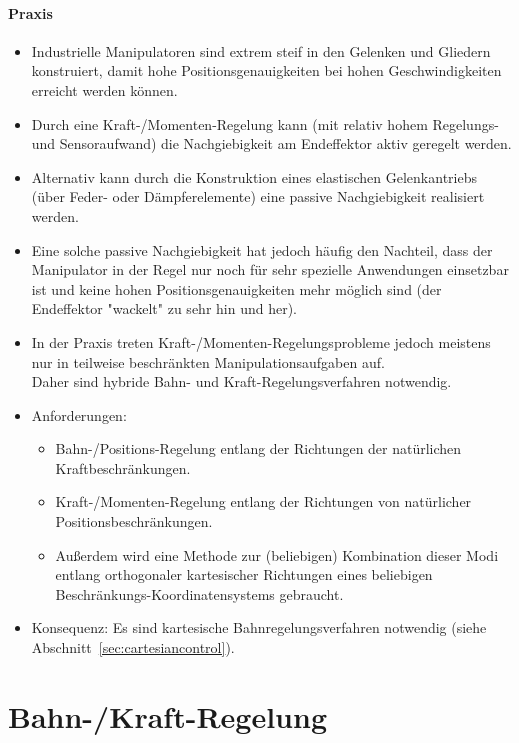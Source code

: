 		\paragraph{Praxis}
			\begin{itemize}
				\item Industrielle Manipulatoren sind extrem steif in den Gelenken und Gliedern konstruiert, damit hohe Positionsgenauigkeiten bei hohen Geschwindigkeiten erreicht werden können.
				\item Durch eine Kraft-/Momenten-Regelung kann (mit relativ hohem Regelungs- und Sensoraufwand) die Nachgiebigkeit am Endeffektor aktiv geregelt werden.
				\item Alternativ kann durch die Konstruktion eines elastischen Gelenkantriebs (\zB über Feder- oder Dämpferelemente) eine passive Nachgiebigkeit realisiert werden.
				\item Eine solche passive Nachgiebigkeit hat jedoch häufig den Nachteil, dass der Manipulator in der Regel nur noch für sehr spezielle Anwendungen einsetzbar ist und keine hohen Positionsgenauigkeiten mehr möglich sind (der Endeffektor "wackelt" zu sehr hin und her).
				\item In der Praxis treten Kraft-/Momenten-Regelungsprobleme jedoch meistens nur in teilweise beschränkten Manipulationsaufgaben auf. \\ Daher sind hybride Bahn- und Kraft-Regelungsverfahren notwendig.
				\item Anforderungen:
					\begin{itemize}
						\item Bahn-/Positions-Regelung entlang der Richtungen der natürlichen Kraftbeschränkungen.
						\item Kraft-/Momenten-Regelung entlang der Richtungen von natürlicher Positionsbeschränkungen.
						\item Außerdem wird eine Methode zur (beliebigen) Kombination dieser Modi entlang orthogonaler kartesischer Richtungen eines beliebigen Beschränkungs-Koordinatensystems gebraucht.
					\end{itemize}
				\item Konsequenz: Es sind kartesische Bahnregelungsverfahren notwendig (siehe Abschnitt~\ref{sec:cartesiancontrol}).
			\end{itemize}

	\section{Bahn-/Kraft-Regelung}
